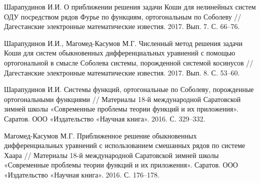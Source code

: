 \documentclass{article}
\numberwithin{equation}{section}
\theoremstyle{plain}
\theoremstyle{definition}
\begin{document}
\begin{thebibliography}{20}

Шарапудинов И.И. О приближении решения задачи Коши для нелинейных систем ОДУ посредством рядов Фурье по функциям, ортогональным по Соболеву // Дагестанские электронные математические известия. 2017. Вып. 7. С. 66--76.


Шарапудинов И.И., Магомед-Касумов М.Г. Численный метод решения задачи Коши для систем обыкновенных дифференциальных уравнений с помощью ортогональной в смысле Соболева системы, порожденной системой косинусов // Дагестанские электронные математические известия. 2017. Вып. 8. С. 53--60.


Шарапудинов И.И. Системы функций, ортогональные по Соболеву, порожденные ортогональными функциями // Материалы 18-й международной Саратовской зимней школы «Современные проблемы теории функций и их приложения». Саратов. ООО «Издательство «Научная книга». 2016. С. 329--332.


Магомед-Касумов М.Г. Приближенное решение обыкновенных дифференциальных уравнений с использованием смешанных рядов по системе Хаара // Материалы 18-й международной Саратовской зимней школы «Современные проблемы теории функций и их приложения». Саратов. ООО «Издательство «Научная книга». 2016. С. 176--178.



\end{thebibliography}
\end{document}
